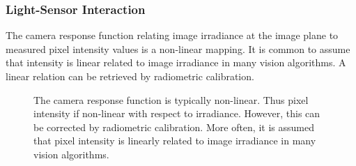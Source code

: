 \subsubsection{Light-Sensor Interaction}
The camera response function relating image irradiance at the image plane to measured pixel intensity values is a non-linear mapping. It is common to assume that intensity is linear related to image irradiance in many vision algorithms. A linear relation can be retrieved by radiometric calibration.
\begin{figure}[!htbp]
\centering
{}
\caption{The camera response function is typically non-linear. Thus pixel intensity if non-linear with respect to irradiance. However, this can be corrected by radiometric calibration. More often, it is assumed that pixel intensity is linearly related to image irradiance in many vision algorithms.}
\label{fig:light_sensor_interact}
\end{figure}

